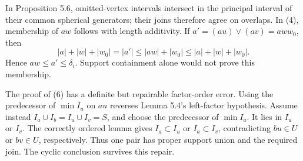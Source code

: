 \documentclass[10pt]{article}
\begin{document}
In Proposition 5.6, omitted-vertex intervals intersect in the principal interval of their common spherical generators; their joins therefore agree on overlaps. In (4), membership of \(aw\) follows with length additivity. If \(a'=(au)\vee(av)=aww_0\), then \[|a|+|w|+|w_0|=|a'|
 \le |aw|+|w_0|\le |a|+|w|+|w_0|.\] Hence \(aw\le a'\le\delta_i\). Support containment alone would not prove this membership.\par
The proof of (6) has a definite but repairable factor-order error. Using the predecessor of \(\min I_u\) on \(au\) reverses Lemma 5.4’s left-factor hypothesis. Assume instead \(I_a\cup I_b=I_u\cup I_v=S\), and choose the predecessor of \(\min I_a\). It lies in \(I_u\) or \(I_v\). The correctly ordered lemma gives \(I_a\subset I_u\) or \(I_a\subset I_v\), contradicting \(bu\in U\) or \(bv\in U\), respectively. Thus one pair has proper support union and the required join. The cyclic conclusion survives this repair.\par
\end{document}
